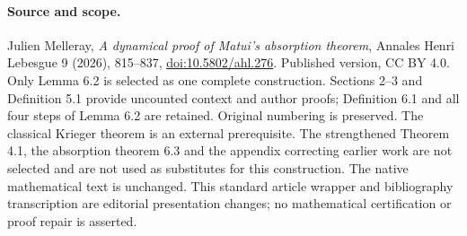 \paragraph{Source and scope.} Julien Melleray, \emph{A dynamical proof of Matui's absorption theorem}, Annales Henri Lebesgue 9 (2026), 815--837, \href{https://doi.org/10.5802/ahl.276}{doi:10.5802/ahl.276}. Published version, CC BY 4.0.
Only Lemma 6.2 is selected as one complete construction. Sections 2--3 and Definition 5.1 provide uncounted context and author proofs; Definition 6.1 and all four steps of Lemma 6.2 are retained. Original numbering is preserved.
The classical Krieger theorem is an external prerequisite. The strengthened Theorem 4.1, the absorption theorem 6.3 and the appendix correcting earlier work are not selected and are not used as substitutes for this construction.
The native mathematical text is unchanged. This standard article wrapper and bibliography transcription are editorial presentation changes; no mathematical certification or proof repair is asserted.
